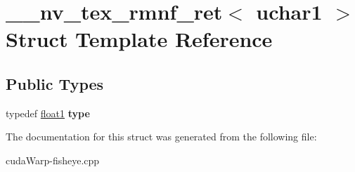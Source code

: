 \hypertarget{struct____nv__tex__rmnf__ret_3_01uchar1_01_4}{}\section{\+\_\+\+\_\+nv\+\_\+tex\+\_\+rmnf\+\_\+ret$<$ uchar1 $>$ Struct Template Reference}
\label{struct____nv__tex__rmnf__ret_3_01uchar1_01_4}
\subsection*{Public Types}
\begin{DoxyCompactItemize}
\item 
typedef \hyperlink{structfloat1}{float1} {\bfseries type}\hypertarget{struct____nv__tex__rmnf__ret_3_01uchar1_01_4_af2183e1bf385ffb4e00a28fae80237f6}{}\label{struct____nv__tex__rmnf__ret_3_01uchar1_01_4_af2183e1bf385ffb4e00a28fae80237f6}

\end{DoxyCompactItemize}


The documentation for this struct was generated from the following file\+:\begin{DoxyCompactItemize}
\item 
cuda\+Warp-\/fisheye.\+cpp\end{DoxyCompactItemize}
